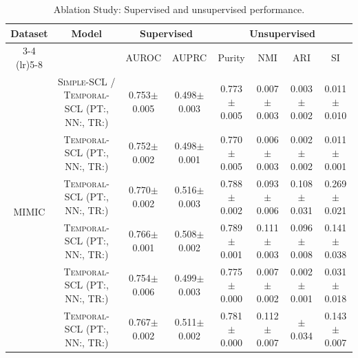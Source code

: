 \documentclass[pmlr,twocolumn,10pt]{jmlr} %
\newcommand{\cbmark}{\ding{51}}
\newcommand{\xbmark}{\ding{55}}
\newcommand{\bftab}{\fontseries{b}\selectfont}
\begin{document}
\begin{table}[ht!]
\caption{Ablation Study: Supervised and unsupervised performance.}
\setlength\tabcolsep{4pt}
\centering
{} {%
\begin{tabular}{cccccccc}
\toprule
\multirow{2}{*}[-2pt]{Dataset} &    \multirow{2}{*}[-2pt]{Model}    & \multicolumn{2}{c}{Supervised}                            & \multicolumn{4}{c}{Unsupervised} \\
                      \cmidrule(lr){3-4} \cmidrule(lr){5-8} %
                       &                                    & AUROC                      & AUPRC                    & Purity                    & NMI                       & ARI                       & SI \\ 
                       \midrule
                       \multirow{8}{*}{MIMIC}                      
                & \textsc{Simple-SCL} / \textsc{Temporal-SCL} (PT:\xbmark, NN:\xbmark, TR:\xbmark)                       & 0.753$\pm$0.005          & 0.498$\pm$0.003            & 0.773$\pm$0.005           & 0.007$\pm$0.003           & 0.003$\pm$0.002           & 0.011$\pm$0.010 \\
                & \textsc{Temporal-SCL} (PT:\cbmark, NN:\xbmark, TR:\xbmark)      & 0.752$\pm$0.002	       & 0.498$\pm$0.001	        & 0.770$\pm$0.005           & 0.006$\pm$0.003           & 0.002$\pm$0.002           & 0.011$\pm$0.001 \\ 
                & \textsc{Temporal-SCL} (PT:\xbmark, NN:\cbmark, TR:\xbmark)   & 0.770$\pm$0.002	       & 0.516$\pm$0.003            & 0.788$\pm$0.002           & 0.093$\pm$0.006           & 0.108$\pm$0.031           & 0.269$\pm$0.021 \\
                & \textsc{Temporal-SCL} (PT:\xbmark, NN:\xbmark, TR:\cbmark)      & 0.766$\pm$0.001	       & 0.508$\pm$0.002	        & 0.789$\pm$0.001           & 0.111$\pm$0.003           & 0.096$\pm$0.008           & 0.141$\pm$0.038 \\
                & \textsc{Temporal-SCL} (PT:\xbmark, NN:\cbmark, TR:\cbmark)       & 0.754$\pm$0.006          & 0.499$\pm$0.003            & 0.775$\pm$0.000           & 0.007$\pm$0.002           & 0.002$\pm$0.001           & 0.031$\pm$0.018 \\
			& \textsc{Temporal-SCL} (PT:\cbmark, NN:\xbmark, TR:\cbmark)      & 0.767$\pm$0.002          & 0.511$\pm$0.002            & 0.781$\pm$0.000           & 0.112$\pm$0.007           & {\bftab 0.150$\pm$0.034}  & 0.143$\pm$0.007 \\ 

\end{tabular}}
\end{table}
\end{document}
